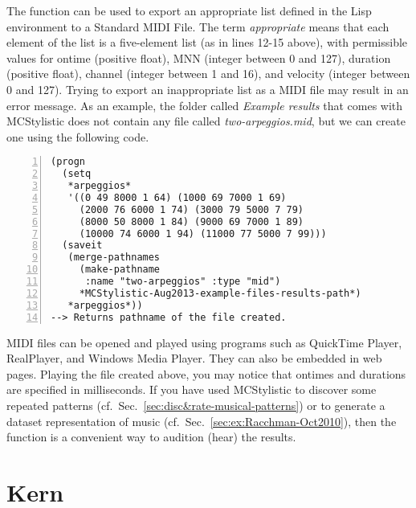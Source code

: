 The function  can be used to export an appropriate list defined in the Lisp environment to a Standard MIDI File. The term \emph{appropriate} means that each element of the list is a five-element list (as in lines 12-15 above), with permissible values for ontime (positive float), MNN (integer between 0 and 127), duration (positive float), channel (integer between 1 and 16), and velocity (integer between 0 and 127). Trying to export an inappropriate list as a MIDI file may result in an error message. As an example, the folder called \emph{Example results} that comes with MCStylistic does not contain any file called \emph{two-arpeggios.mid}, but we can create one using the following code.
\begin{Verbatim}[frame=single,numbers=left]
(progn
  (setq
   *arpeggios*
   '((0 49 8000 1 64) (1000 69 7000 1 69)
     (2000 76 6000 1 74) (3000 79 5000 7 79)
     (8000 50 8000 1 84) (9000 69 7000 1 89)
     (10000 74 6000 1 94) (11000 77 5000 7 99)))
  (saveit
   (merge-pathnames
     (make-pathname
      :name "two-arpeggios" :type "mid")
     *MCStylistic-Aug2013-example-files-results-path*)
   *arpeggios*))
--> Returns pathname of the file created.
\end{Verbatim}
MIDI files can be opened and played using programs such as QuickTime Player, RealPlayer, and Windows Media Player. They can also be embedded in web pages. Playing the file created above, you may notice that ontimes and durations are specified in milliseconds. If you have used MCStylistic to discover some repeated patterns (cf.~Sec.~\ref{sec:disc&rate-musical-patterns}) or to generate a dataset representation of music (cf.~Sec.~\ref{sec:ex:Racchman-Oct2010}), then the function  is a convenient way to audition (hear) the results.

\section{Kern}\label{sec:kern-import}


